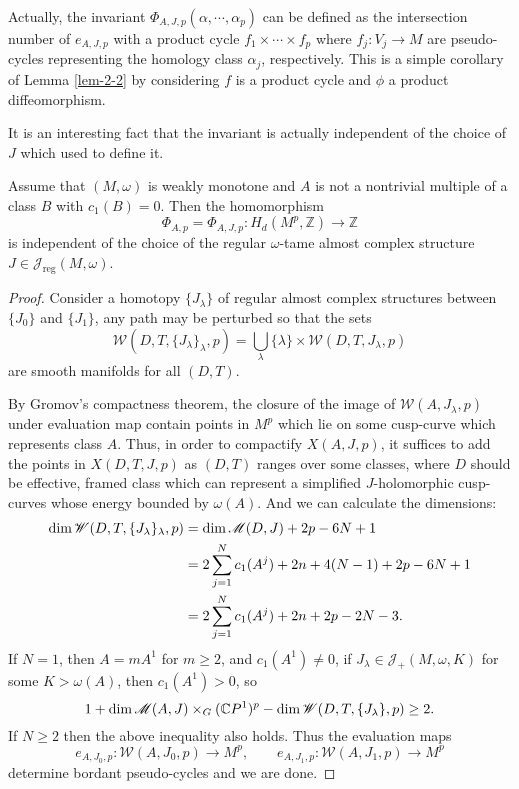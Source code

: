 \documentclass[twoside]{article}
\begin{document}
\begin{remark}
Actually, the invariant $\Phi_{A,J,p}(\alpha,\cdots,\alpha_p)$ can be defined as 
the intersection number of $e_{A,J,p}$ with a product cycle $f_1\times\cdots\times f_p$ 
where $f_j\colon V_j\rightarrow M$ are pseudo-cycles representing the homology class $\alpha_j$, respectively. 
This is a simple corollary of Lemma \ref{lem-2-2} by considering $f$ is a product cycle and $\phi$ a product diffeomorphism.
\end{remark}

It is an interesting fact that the invariant is actually independent of the choice of $J$ which used to define it.

\begin{proposition} \label{prop-4-2}
    Assume that $(M,\omega)$ is weakly monotone and 
    $A$ is not a nontrivial multiple of a class $B$ with $c_1(B)=0$. Then the homomorphism
    \[\Phi_{A,p}=\Phi_{A,J,p}\colon H_d(M^p,\mathbb{Z})\rightarrow \mathbb{Z}\]
    is independent of the choice of the regular $\omega$-tame 
    almost complex structure $J\in \mathscr{J}_{\mathrm{reg}}(M,\omega)$.
\end{proposition}

\begin{proof}
    Consider a homotopy $\{J_\lambda\}$ of regular almost complex structures 
    between $\{J_0\}$ and $\{J_1\}$, any path may be perturbed so that the sets
    \[\mathscr{W}(D,T,\{J_\lambda\}_\lambda,p)=\bigcup_{\lambda}\{\lambda\}\times\mathscr{W}(D,T,J_\lambda,p)\]
    are smooth manifolds for all $(D,T)$.
    
    By Gromov's compactness theorem, the closure of 
    the image of $\mathscr{W}(A,J_\lambda,p)$ under evaluation map 
    contain points in $M^p$ which lie on some cusp-curve 
    which represents class $A$. Thus, in order to compactify $X(A,J,p)$, 
    it suffices to add the points in $X(D,T,J,p)$ as $(D,T)$ ranges over some classes, 
    where $D$ should be effective, framed class which can represent 
    a simplified $J$-holomorphic cusp-curves 
    whose energy bounded by $\omega(A)$. And we can calculate the dimensions:
    \[ \begin{aligned}
        \dim\mathscr{W}(D,T,\{J_\lambda\}_\lambda,p)&= \dim \mathscr{M}(D,J)+2p-6N+1\\
        &=2\sum_{j=1}^{N}c_1(A^j)+2n+4(N-1)+2p-6N+1\\
        &=2\sum_{j=1}^{N}c_1(A^j)+2n+2p-2N-3.
    \end{aligned} \]
    If $N=1$, then $A=mA^1$ for $m\geq 2$, and $c_1(A^1)\neq0$, 
    if $J_\lambda\in\mathscr{J}_+(M,\omega,K)$ for some $K>\omega(A)$, then $c_1(A^1)>0$, so
    \[1+\dim \mathscr{M}(A,J)\times_G(\mathbb{C}P^{1})^p-\dim\mathscr{W}(D,T,\{J_\lambda\},p)\geq 2.\]
    If $N\geq 2$ then the above inequality also holds.
    Thus the evaluation maps
    \[e_{A,J_0,p}\colon \mathscr{W}(A,J_0,p)\rightarrow M^p,\qquad e_{A,J_1,p}\colon \mathscr{W}(A,J_1,p)\rightarrow M^p\]
    determine bordant pseudo-cycles and we are done. 
\end{proof}
\end{document}

